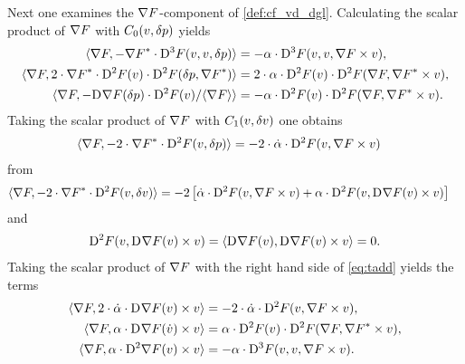 Next one examines the $ \nabla F $-component of \eqref{def:cf_vd_dgl}.
Calculating the scalar product of $ \nabla F $ with $ C_0( v, \delta p ) $
yields
\begin{subequations}
    \label{vdgk:1}
    \begin{align}
        \langle  \nabla F ,  - {\nabla F}^* \cdot
        \mathrm{D}^{ 3 }F( v, v, \delta p )  \rangle
        &=
        - \alpha \cdot \mathrm{D}^{ 3 }F( v, v, \nabla F \times v ) ,
        \label{vdgk:1:a}
        \\
        \langle  \nabla F ,  2 \cdot { \nabla F }^* \cdot \mathrm{D}^{ 2 }F( v ) \cdot
        \mathrm{D}^{ 2 }F( \delta p, {\nabla F}^* )  \rangle
        &=
        2 \cdot \alpha \cdot \mathrm{D}^{ 2 }F( v ) \cdot
        \mathrm{D}^{ 2 }F( \nabla F, {\nabla F}^* \times v ) ,
        \label{vdgk:1:c}
        \\
        \langle  \nabla F ,  -\mathrm{D}^{  }\nabla F( \delta p ) \cdot \mathrm{D}^{ 2 }F( v ) / \langle  \nabla F  \rangle  \rangle
        &=
        - \alpha \cdot \mathrm{D}^{ 2 }F( v ) \cdot
        \mathrm{D}^{ 2 }F( \nabla F, {\nabla F}^* \times v ) .
        \label{vdgk:1:d}
    \end{align}
\end{subequations}
Taking the scalar product of $ \nabla F $
with $ C_1( v, \delta v ) $ one obtains
\begin{align}
        \langle  \nabla F ,  -2 \cdot { \nabla F }^* \cdot \mathrm{D}^{ 2 }F( v, \delta p )  \rangle
        &=
        - 2 \cdot \dot{ \alpha }  \cdot  \mathrm{D}^{ 2 }F( v, \nabla F \times v )
        \label{vdgk:1:b}
\end{align}
from
\begin{align*}
    \langle  \nabla F ,  -2 \cdot { \nabla F }^* \cdot \mathrm{D}^{ 2 }F( v, \delta v )  \rangle
    &=
    - 2 \left[ \dot{ \alpha }  \cdot  \mathrm{D}^{ 2 }F( v, \nabla F \times v )
    +
    \alpha  \cdot \mathrm{D}^{ 2 }F( v, \mathrm{D}^{  }\nabla F( v ) \times v ) \right]
\end{align*}
and
\begin{align*}
    \mathrm{D}^{ 2 }F( v, \mathrm{D}^{  }\nabla F( v ) \times v )
    =
    \langle  \mathrm{D}^{  }\nabla F( v ) ,  \mathrm{D}^{  }\nabla F( v ) \times v  \rangle
    =
    0 .
\end{align*}
Taking the scalar product of $ \nabla F $
with the right hand side of \eqref{eq:tadd} yields the terms
\begin{subequations}
    \label{vdgk:2}
    \begin{align}
        \langle  \nabla F ,  2 \cdot \dot{ \alpha } \cdot \mathrm{D}^{  }\nabla F( v ) \times v  \rangle
        &=
        - 2 \cdot \dot{ \alpha } \cdot \mathrm{D}^{ 2 }F( v, \nabla F \times v ) ,
        \label{vdgk:2:a}
        \\
        \langle  \nabla F ,  \alpha \cdot \mathrm{D}^{  } \nabla F ( \dot{ v } ) \times v  \rangle
        &=
        \alpha \cdot \mathrm{D}^{ 2 }F( v ) \cdot
        \mathrm{D}^{ 2 }F( \nabla F, {\nabla F}^* \times v ) ,
        \label{vdgk:2:b}
        \\
        \langle  \nabla F ,  \alpha \cdot \mathrm{D}^{ 2 }\nabla F( v ) \times v  \rangle
        &=
        - \alpha \cdot \mathrm{D}^{ 3 }F( v, v, \nabla F \times v ) .
        \label{vdgk:2:c}
    \end{align}
\end{subequations}
